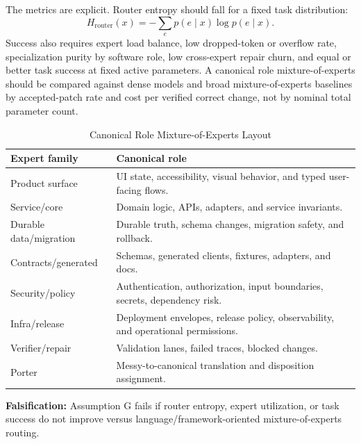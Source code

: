 The metrics are explicit. Router entropy should fall for a fixed task distribution:
\begin{equation}
H_{\mathrm{router}}(x)=-\sum_e p(e\mid x)\log p(e\mid x).
\end{equation}
Success also requires expert load balance, low dropped-token or overflow rate, specialization purity by software role, low cross-expert repair churn, and equal or better task success at fixed active parameters. A canonical role mixture-of-experts should be compared against dense models and broad mixture-of-experts baselines by accepted-patch rate and cost per verified correct change, not by nominal total parameter count.

\begin{table}[t]
\caption{Canonical Role Mixture-of-Experts Layout}
\label{tab:rolemoe}
\centering
\footnotesize
\begin{tabularx}{\columnwidth}{p{}X}
\toprule
Expert family & Canonical role \\
\midrule
Product surface & UI state, accessibility, visual behavior, and typed user-facing flows. \\
Service/core & Domain logic, APIs, adapters, and service invariants. \\
Durable data/migration & Durable truth, schema changes, migration safety, and rollback. \\
Contracts/generated & Schemas, generated clients, fixtures, adapters, and docs. \\
Security/policy & Authentication, authorization, input boundaries, secrets, dependency risk. \\
Infra/release & Deployment envelopes, release policy, observability, and operational permissions. \\
Verifier/repair & Validation lanes, failed traces, blocked changes. \\
Porter & Messy-to-canonical translation and disposition assignment. \\
\bottomrule
\end{tabularx}
\end{table}

\textbf{Falsification:} Assumption G fails if router entropy, expert utilization, or task success do not improve versus language/framework-oriented mixture-of-experts routing.

